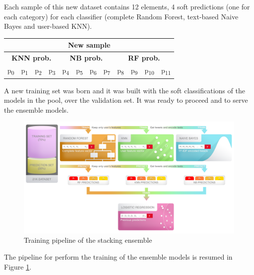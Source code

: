 Each sample of this new dataset contains 12 elements, 4 soft predictions (one for each category) for each classifier (complete Random Forest, text-based Naive Bayes and user-based KNN).

\begin{center}
	\begin{tabular}{@{}c|c|c|c|c|c|c|c|c|c|c|c@{}}
		\multicolumn{12}{c}{New sample} \\
		\hline
		\multicolumn{4}{c|}{\textbf{KNN prob.}} & 
		\multicolumn{4}{c|}{\textbf{NB prob.}} & 
		\multicolumn{4}{c}{\textbf{RF prob.}}\\
		\hline
		\multicolumn{1}{c|}{p\textsubscript{0}} &
		\multicolumn{1}{c|}{p\textsubscript{1}} &
		\multicolumn{1}{c|}{p\textsubscript{2}} &
		\multicolumn{1}{c|}{p\textsubscript{3}} &
		\multicolumn{1}{c|}{p\textsubscript{4}} &
		\multicolumn{1}{c|}{p\textsubscript{5}} &
		\multicolumn{1}{c|}{p\textsubscript{6}} &
		\multicolumn{1}{c|}{p\textsubscript{7}} &	
		\multicolumn{1}{c|}{p\textsubscript{8}} &
		\multicolumn{1}{c|}{p\textsubscript{9}} &
		\multicolumn{1}{c|}{p\textsubscript{10}} &
		\multicolumn{1}{c}{p\textsubscript{11}}\\
		\hline
	\end{tabular}
\end{center}

A new training set was born and it was built with the soft classifications of the models in the pool, over the validation set. It was ready to proceed and to serve the ensemble models.\\

\begin{figure}[htp!]
	\centering
	\includegraphics[width=\columnwidth]{chapter5/figure/stacking_train.png}
	\caption{Training pipeline of the stacking ensemble}
	\label{fig:stacking_pipeline}
\end{figure}
The pipeline for perform the training of the ensemble models is resumed in Figure \ref{fig:stacking_pipeline}.

